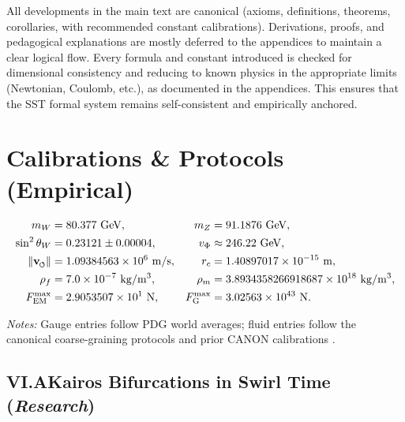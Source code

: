 \documentclass[reprint,aps,onecolumn,nofootinbib]{revtex4-2}
\newcommand{\swirlarrow}{%
    \mathchoice{\mkern-2mu\scriptstyle\boldsymbol{\circlearrowleft}}%
    {\mkern-2mu\scriptstyle\boldsymbol{\circlearrowleft}}%
    {\mkern-2mu\scriptscriptstyle\boldsymbol{\circlearrowleft}}%
    {\mkern-2mu\scriptscriptstyle\boldsymbol{\circlearrowleft}}%
}
\newcommand{\vswirl}{\mathbf{v}_{\swirlarrow}}
\newcommand{\vnorm}{\lVert \vswirl \rVert}               %
\begin{document}
	All developments in the main text are canonical (axioms, definitions, theorems, corollaries, with recommended constant calibrations). Derivations, proofs, and pedagogical explanations are mostly deferred to the appendices to maintain a clear logical flow. Every formula and constant introduced is checked for dimensional consistency and reducing to known physics in the appropriate limits (Newtonian, Coulomb, etc.), as documented in the appendices. This ensures that the SST formal system remains self-consistent and empirically anchored.


    \section{Calibrations \& Protocols (Empirical)}\label{canon58:calibrations}
    \begin{tcolorbox}[title=Empirical Anchors]
    \begin{align*}
    m_W &= 80.377~\mathrm{GeV}, & m_Z &= 91.1876~\mathrm{GeV},\\
    \sin^2\theta_W &= 0.23121 \pm 0.00004, & v_\Phi &\approx 246.22~\mathrm{GeV},\\
    \vnorm &= 1.09384563\times10^{6}~\mathrm{m/s}, & r_c &= 1.40897017\times10^{-15}~\mathrm{m},\\
    \rho_f &= 7.0\times10^{-7}~\mathrm{kg/m^3}, & \rho_m &= 3.8934358266918687\times10^{18}~\mathrm{kg/m^3},\\
    F_{\rm EM}^{\max} &= 2.9053507\times10^{1}~\mathrm{N}, & F_{\rm G}^{\max} &= 3.02563\times10^{43}~\mathrm{N}.
    \end{align*}
    \end{tcolorbox}
    \noindent\emph{Notes:} Gauge entries follow PDG world averages; fluid entries follow the canonical coarse-graining protocols and prior CANON calibrations \cite{PDG2024,Iskandarani2025Canon034,Iskandarani2025Hydrogen}.
    \subsection*{VI.A\quad Kairos Bifurcations in Swirl Time \;(\emph{Research})}
\end{document}
